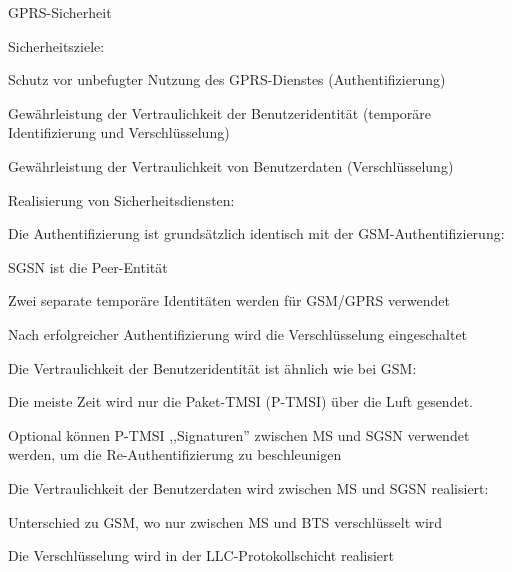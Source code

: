 \documentclass[a4paper]{article}
\begin{document}
\begin{multicols}{3}
      GPRS-Sicherheit
      \begin{itemize*}
            \item Sicherheitsziele:
            \begin{itemize*}
                  \item Schutz vor unbefugter Nutzung des GPRS-Dienstes (Authentifizierung)
                  \item Gewährleistung der Vertraulichkeit der Benutzeridentität (temporäre Identifizierung und Verschlüsselung)
                  \item Gewährleistung der Vertraulichkeit von Benutzerdaten (Verschlüsselung)
            \end{itemize*}
            \item Realisierung von Sicherheitsdiensten:
            \begin{itemize*}
                  \item Die Authentifizierung ist grundsätzlich identisch mit der GSM-Authentifizierung:
                  \begin{itemize*} 
                        \item SGSN ist die Peer-Entität 
                        \item Zwei separate temporäre Identitäten werden für GSM/GPRS verwendet 
                        \item Nach erfolgreicher Authentifizierung wird die Verschlüsselung eingeschaltet 
                  \end{itemize*}
                  \item Die Vertraulichkeit der Benutzeridentität ist ähnlich wie bei GSM:
                  \begin{itemize*} 
                        \item Die meiste Zeit wird nur die Paket-TMSI (P-TMSI) über die Luft gesendet. 
                        \item Optional können P-TMSI ,,Signaturen'' zwischen MS und SGSN verwendet werden, um die Re-Authentifizierung zu beschleunigen 
                  \end{itemize*}
                  \item Die Vertraulichkeit der Benutzerdaten wird zwischen MS und SGSN realisiert:
                  \begin{itemize*} 
                        \item Unterschied zu GSM, wo nur zwischen MS und BTS verschlüsselt wird 
                        \item Die Verschlüsselung wird in der LLC-Protokollschicht realisiert 
                  \end{itemize*}
            \end{itemize*}
      \end{itemize*}


\end{multicols}
\end{document}
